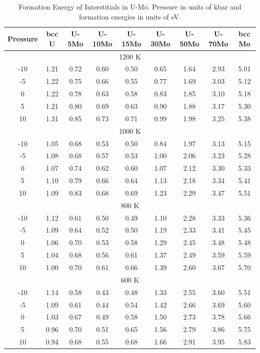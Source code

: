 \documentclass[review]{elsarticle}
\begin{document}
\begin{table}[h]
    \centering
     \caption{Formation Energy of Interstitials in U-Mo. Pressure in units of kbar and formation energies in units of eV.}
    \begin{tabular}{c|c|c|c|c|c|c|c|c}
    \toprule
 Pressure & bcc U & U-5Mo & U-10Mo & U-15Mo & U-30Mo & U-50Mo & U-70Mo & bcc Mo \\
 \hline
 \multicolumn{9}{c}{1200 K} \\
 \hline
 -10 & 1.21 &	0.72 &	0.60 &	0.50 &	0.65 &	1.64 &	2.93 &	5.01 \\
 -5 & 1.22 &	0.75 &	0.66 &	0.55 &	0.77 &	1.69 &	3.03 &	5.12 \\
 0 & 1.22 &	0.78 &	0.63 &	0.58 &	0.83 &	1.85 &	3.10 &	5.18 \\
 5 & 1.21 &	0.80 &	0.69 &	0.63 &	0.90 &	1.88 &	3.17 &	5.30 \\
 10 & 1.31 &	0.85 &	0.73 &	0.71 &	0.99 &	1.98 &	3.25 &	5.38 \\
 \hline
  \multicolumn{9}{c}{1000 K} \\
   \hline
-10	&1.05&	0.68&	0.53&	0.50&	0.84&	1.97&	3.13&	5.15 \\
-5	&1.08&	0.68&	0.57&	0.53&	1.00&	2.06&	3.23&	5.28 \\
0	&1.07&	0.74&	0.62&	0.60&	1.07&	2.12&	3.30&	5.33 \\
5	&1.10&	0.79&	0.66&	0.64&	1.13&	2.18&	3.34&	5.41 \\
10	&1.09&	0.83&	0.68&	0.69&	1.23&	2.29&	3.47&	5.51 \\
  \hline
  \multicolumn{9}{c}{800 K} \\
  \hline
-10	&1.12&	0.61&	0.50&	0.49&	1.10&	2.28&	3.33&	5.36 \\
-5	&1.09&	0.64&	0.52&	0.50&	1.19&	2.33&	3.41&	5.45 \\
0	&1.06&	0.70&	0.53&	0.58&	1.29&	2.45&	3.48&	5.48 \\
5	&1.04&	0.68&	0.56&	0.61&	1.37&	2.49&	3.59&	5.59 \\
10	&1.00&	0.70&	0.61&	0.66&	1.39&	2.60&	3.67&	5.70 \\
  \hline
  \multicolumn{9}{c}{600 K} \\
  \hline
-10	&1.14&	0.58&	0.43&	0.48&	1.33&	2.55&	3.60&	5.51 \\
-5	&1.09&	0.61&	0.44&	0.54&	1.42&	2.66&	3.69&	5.60 \\
0	&1.03&	0.67&	0.49&	0.58&	1.50&	2.73&	3.78&	5.66 \\ 
5	&0.96&	0.70&	0.51&	0.65&	1.56&	2.79&	3.86&	5.75 \\
10	&0.94&	0.68&	0.55&	0.68&	1.66&	2.91&	3.95&	5.83 \\
\hline
    \end{tabular}
    \label{tab:EformI}
\end{table}
\end{document}
